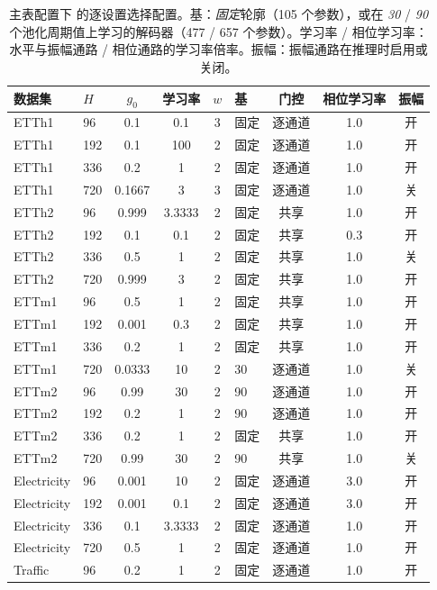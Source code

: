 {\begin{table}[t]
\centering
\caption{主表配置下 \sysplus 的逐设置选择配置。基：\emph{固定}轮廓（105 个参数），或在 \emph{30} / \emph{90} 个池化周期值上学习的解码器（477 / 657 个参数）。学习率 / 相位学习率：水平与振幅通路 / 相位通路的学习率倍率。振幅：振幅通路在推理时启用或关闭。}
\label{tab:la_config}
\footnotesize
\setlength{\tabcolsep}{2.6pt}
\begin{tabular}{llccclccc}
\toprule
数据集 & $H$ & $g_0$ & 学习率 & $w$ & 基 & 门控 & 相位学习率 & 振幅 \\
\midrule
ETTh1 & 96 & 0.1 & 0.1 & 3 & 固定 & 逐通道 & 1.0 & 开 \\
ETTh1 & 192 & 0.1 & 100 & 2 & 固定 & 逐通道 & 1.0 & 开 \\
ETTh1 & 336 & 0.2 & 1 & 2 & 固定 & 逐通道 & 1.0 & 开 \\
ETTh1 & 720 & 0.1667 & 3 & 3 & 固定 & 逐通道 & 1.0 & 关 \\
ETTh2 & 96 & 0.999 & 3.3333 & 2 & 固定 & 共享 & 1.0 & 开 \\
ETTh2 & 192 & 0.1 & 0.1 & 2 & 固定 & 共享 & 0.3 & 开 \\
ETTh2 & 336 & 0.5 & 1 & 2 & 固定 & 共享 & 1.0 & 关 \\
ETTh2 & 720 & 0.999 & 3 & 2 & 固定 & 共享 & 1.0 & 开 \\
ETTm1 & 96 & 0.5 & 1 & 2 & 固定 & 共享 & 1.0 & 开 \\
ETTm1 & 192 & 0.001 & 0.3 & 2 & 固定 & 共享 & 1.0 & 开 \\
ETTm1 & 336 & 0.2 & 1 & 2 & 固定 & 共享 & 1.0 & 开 \\
ETTm1 & 720 & 0.0333 & 10 & 2 & 30 & 逐通道 & 1.0 & 关 \\
ETTm2 & 96 & 0.99 & 30 & 2 & 90 & 逐通道 & 1.0 & 开 \\
ETTm2 & 192 & 0.2 & 1 & 2 & 90 & 逐通道 & 1.0 & 开 \\
ETTm2 & 336 & 0.2 & 1 & 2 & 固定 & 共享 & 1.0 & 开 \\
ETTm2 & 720 & 0.99 & 30 & 2 & 90 & 共享 & 1.0 & 关 \\
Electricity & 96 & 0.001 & 10 & 2 & 固定 & 逐通道 & 3.0 & 开 \\
Electricity & 192 & 0.001 & 0.1 & 2 & 固定 & 逐通道 & 3.0 & 开 \\
Electricity & 336 & 0.1 & 3.3333 & 2 & 固定 & 逐通道 & 1.0 & 开 \\
Electricity & 720 & 0.5 & 1 & 2 & 固定 & 逐通道 & 1.0 & 开 \\
Traffic & 96 & 0.2 & 1 & 2 & 固定 & 逐通道 & 1.0 & 开 \\

\end{tabular}
\end{table}}

